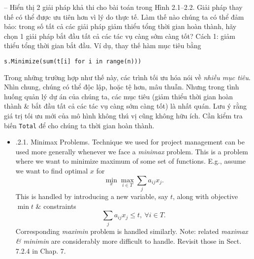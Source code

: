 \documentclass{article}
\begin{document}
\begin{itemize}
\begin{itemize}
\begin{itemize}
            -- Hiển thị 2 giải pháp khả thi cho bài toán trong {\sf Hình 2.1--2.2}. Giải pháp thay thế có thể được ưu tiên hơn vì lý do thực tế. Làm thế nào chúng ta có thể đảm bảo: trong số tất cả các giải pháp giảm thiểu tổng thời gian hoàn thành, hãy chọn 1 giải pháp bắt đầu tất cả các tác vụ càng sớm càng tốt? Cách 1: giảm thiểu tổng thời gian bắt đầu. Ví dụ, thay thế hàm mục tiêu bằng
            \begin{verbatim}
s.Minimize(sum(t[i] for i in range(n)))
            \end{verbatim}
            Trong những trường hợp như thế này, các trình tối ưu hóa nói về {\it nhiều mục tiêu}. Nhìn chung, chúng có thể độc lập, hoặc tệ hơn, mâu thuẫn. Nhưng trong tình huống quản lý dự án của chúng ta, các mục tiêu (giảm thiểu thời gian hoàn thành \& bắt đầu tất cả các tác vụ càng sớm càng tốt) là nhất quán. Lưu ý rằng giá trị tối ưu mới của mô hình không thú vị cũng không hữu ích. Cần kiểm tra biến {\tt Total} để cho chúng ta thời gian hoàn thành.
            \begin{itemize}
                \item {.2.1. Minimax Problems.} Technique we used for project management can be used more generally whenever we face a {\it minimax} problem. This is a problem where we want to minimize maximum of some set of functions. E.g., assume we want to find optimal $x$ for
                \begin{equation*}
                    \min_x\max_{i\in T}\sum_j a_{ij}x_j.
                \end{equation*}
                This is handled by introducing a new variable, say $t$, along with objective $\min t$ \& constraints
                \begin{equation*}
                    \sum_j a_{ij}x_j\le t,\ \forall i\in T.
                \end{equation*}
                Corresponding {\it maximin} problem is handled similarly. Note: related {\it maximax \& minimin} are considerably more difficult to handle. Revisit those in Sect. 7.2.4 in Chap. 7.


\end{itemize}
\end{itemize}
\end{itemize}
\end{itemize}
\end{document}
